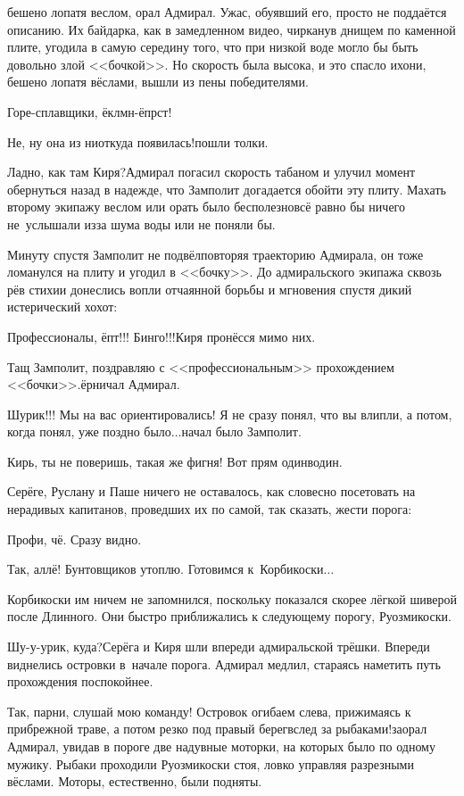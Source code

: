 \mdash бешено лопатя веслом, орал Адмирал. Ужас, обуявший его, просто не поддаётся описанию. Их байдарка, как в замедленном видео, чирканув днищем по каменной плите, угодила в самую середину того, что при низкой воде могло бы быть довольно злой <<бочкой>>. Но скорость была высока, и это спасло их\mdash они, бешено лопатя вёслами, вышли из пены победителями.

\diagdash Горе-сплавщики, ёклмн-ёпрст!

\diagdash Не, ну она из ниоткуда появилась!\mdash пошли толки.

\diagdash Ладно, как там Киря?\mdash Адмирал погасил скорость табаном и улучил момент обернуться назад в надежде, что Замполит догадается обойти эту плиту. Махать второму экипажу веслом или орать было бесполезно\mdash всё равно бы ничего не~услышали из\sdash за шума воды или не поняли бы. 

Минуту спустя Замполит не подвёл\mdash повторяя траекторию Адмирала, он тоже ломанулся на плиту и угодил в <<бочку>>. До адмиральского экипажа сквозь рёв стихии донеслись вопли отчаянной борьбы и мгновения спустя дикий истерический хохот:

\diagdash Профессионалы, ёпт!!! Бинго!!!\mdash Киря пронёсся мимо них.

\diagdash Тащ Замполит, поздравляю с <<профессиональным>> прохождением <<бочки>>.\mdash ёрничал Адмирал.

\diagdash Шурик!!! Мы на вас ориентировались! Я не сразу понял, что вы влипли, а потом, когда понял, уже поздно было$\ldots$\mdash начал было Замполит.

\diagdash Кирь, ты не поверишь, такая же фигня! Вот прям один\sdash в\sdash один.

Серёге, Руслану и Паше ничего не оставалось, как словесно посетовать на нерадивых капитанов, проведших их по самой, так сказать, жести порога:

\diagdash Профи, чё. Сразу видно.

\diagdash Так, аллё! Бунтовщиков утоплю. Готовимся к~Корбикоски$\ldots$

Корбикоски им ничем не запомнился, поскольку показался скорее лёгкой шиверой после Длинного. Они быстро приближались к следующему порогу, Руозмикоски. 

\diagdash Шу-у-урик, куда?\mdash Серёга и Киря шли впереди адмиральской трёшки. Впереди виднелись островки в~начале порога. Адмирал медлил, стараясь наметить путь прохождения поспокойнее.

\diagdash Так, парни, слушай мою команду! Островок огибаем слева, прижимаясь к прибрежной траве, а потом резко под правый берег\mdash вслед за рыбаками!\mdash заорал Адмирал, увидав в пороге две надувные моторки, на которых было по одному мужику. Рыбаки проходили Руозмикоски стоя, ловко управляя разрезными вёслами. Моторы, естественно, были подняты.

